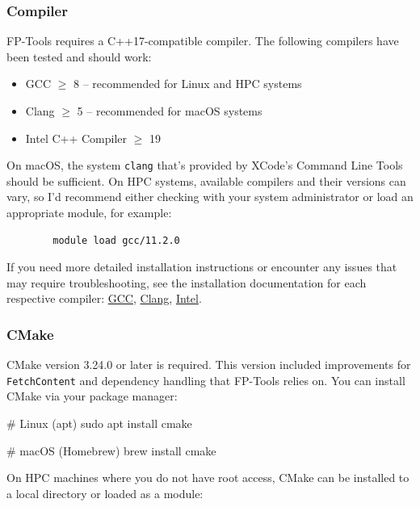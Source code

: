 \subsubsection{Compiler}

FP-Tools requires a C++17-compatible compiler. The following compilers have 
been tested and should work:
\begin{itemize}
    \item GCC $\geq$ 8 -- recommended for Linux and HPC systems
    \item Clang $\geq$ 5  -- recommended for macOS systems
    \item Intel C++ Compiler $\geq$ 19
\end{itemize}

\begin{note}
    On macOS, the system \texttt{clang} that's provided by XCode's Command Line
    Tools should be sufficient. On HPC systems, available compilers and their
    versions can vary, so I'd recommend either checking with your system
    administrator or load an appropriate module, for example:
    \begin{verbatim}
        module load gcc/11.2.0
    \end{verbatim}
\end{note}

If you need more detailed installation instructions or encounter any issues that
may require troubleshooting, see the installation documentation for each 
respective compiler: 
\href{https://gcc.gnu.org/wiki/InstallingGCC}{GCC}, 
\href{https://clang.llvm.org/get_started.html}{Clang},
\href{https://www.intel.com/content/www/us/en/developer/tools/oneapi/dpc-compiler-download.html}{Intel}.

\subsubsection{CMake}

CMake version 3.24.0 or later is required. This version included improvements for \texttt{FetchContent} and dependency handling that FP-Tools relies on. You 
can install CMake via your package manager:

\begin{bashcode}
# Linux (apt)
sudo apt install cmake

# macOS (Homebrew)
brew install cmake
\end{bashcode}

On HPC machines where you do not have root access, CMake can be installed to a 
local directory or loaded as a module:

